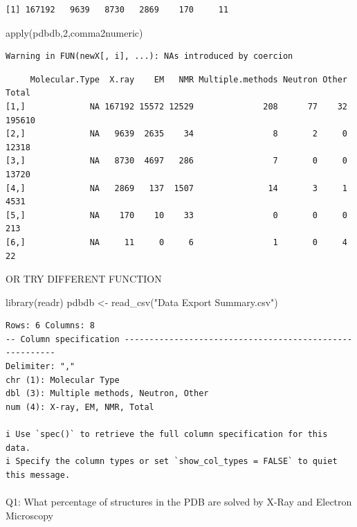 \documentclass[
  letterpaper,
  DIV=11,
  numbers=noendperiod]{scrartcl}
\makeatletter
\let\oldparagraph\paragraph
\renewcommand{\paragraph}{
    \@ifstar
      \xxxParagraphStar
      \xxxParagraphNoStar
  }
\newcommand{\xxxParagraphStar}[1]{\oldparagraph*{#1}\mbox{}}
\newcommand{\xxxParagraphNoStar}[1]{\oldparagraph{#1}\mbox{}}
\newenvironment{Shaded}{\begin{snugshade}}{\end{snugshade}}
\newcommand{\DecValTok}[1]{\textcolor[rgb]{0.68,0.00,0.00}{#1}}
\newcommand{\FunctionTok}[1]{\textcolor[rgb]{0.28,0.35,0.67}{#1}}
\newcommand{\NormalTok}[1]{\textcolor[rgb]{0.00,0.23,0.31}{#1}}
\newcommand{\OtherTok}[1]{\textcolor[rgb]{0.00,0.23,0.31}{#1}}
\newcommand{\StringTok}[1]{\textcolor[rgb]{0.13,0.47,0.30}{#1}}
\makeatother
\begin{document}
\begin{verbatim}
[1] 167192   9639   8730   2869    170     11
\end{verbatim}

\begin{Shaded}
\begin{Highlighting}[]
\FunctionTok{apply}\NormalTok{(pdbdb,}\DecValTok{2}\NormalTok{,comma2numeric)}
\end{Highlighting}
\end{Shaded}

\begin{verbatim}
Warning in FUN(newX[, i], ...): NAs introduced by coercion
\end{verbatim}

\begin{verbatim}
     Molecular.Type  X.ray    EM   NMR Multiple.methods Neutron Other  Total
[1,]             NA 167192 15572 12529              208      77    32 195610
[2,]             NA   9639  2635    34                8       2     0  12318
[3,]             NA   8730  4697   286                7       0     0  13720
[4,]             NA   2869   137  1507               14       3     1   4531
[5,]             NA    170    10    33                0       0     0    213
[6,]             NA     11     0     6                1       0     4     22
\end{verbatim}

OR TRY DIFFERENT FUNCTION

\begin{Shaded}
\begin{Highlighting}[]
\FunctionTok{library}\NormalTok{(readr)}
\NormalTok{pdbdb }\OtherTok{\textless{}{-}} \FunctionTok{read\_csv}\NormalTok{(}\StringTok{"Data Export Summary.csv"}\NormalTok{)}
\end{Highlighting}
\end{Shaded}

\begin{verbatim}
Rows: 6 Columns: 8
-- Column specification --------------------------------------------------------
Delimiter: ","
chr (1): Molecular Type
dbl (3): Multiple methods, Neutron, Other
num (4): X-ray, EM, NMR, Total

i Use `spec()` to retrieve the full column specification for this data.
i Specify the column types or set `show_col_types = FALSE` to quiet this message.
\end{verbatim}

\paragraph{Q1: What percentage of structures in the PDB are solved by
X-Ray and Electron
Microscopy}\label{q1-what-percentage-of-structures-in-the-pdb-are-solved-by-x-ray-and-electron-microscopy}
\end{document}
